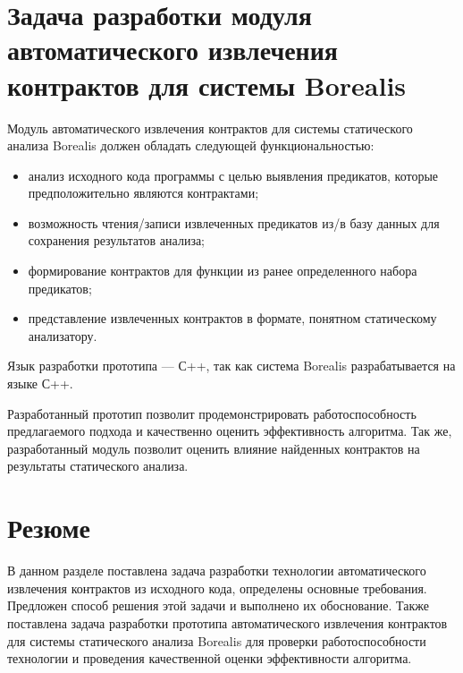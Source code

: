\section{Задача разработки модуля автоматического извлечения контрактов для системы Borealis}
Модуль автоматического извлечения контрактов для системы статического анализа Borealis должен обладать следующей функциональностью:
\begin{itemize}
\item анализ исходного кода программы с целью выявления предикатов, которые предположительно являются контрактами;
\item возможность чтения/записи извлеченных предикатов из/в базу данных для сохранения результатов анализа;
\item формирование контрактов для функции из ранее определенного набора предикатов;
\item представление извлеченных контрактов в формате, понятном статическому анализатору.
\end{itemize}
Язык разработки прототипа --- С++\cite{languageC++}, так как система Borealis разрабатывается на языке С++.

Разработанный прототип позволит продемонстрировать работоспособность предлагаемого подхода и качественно оценить эффективность алгоритма. Так же, разработанный модуль позволит оценить влияние найденных контрактов на результаты статического анализа.

\section{Резюме}
В данном разделе поставлена задача разработки технологии автоматического извлечения контрактов из исходного кода, определены основные требования. Предложен способ решения этой задачи и выполнено их обоснование. Также поставлена задача разработки прототипа автоматического извлечения контрактов для системы статического анализа Borealis для проверки работоспособности технологии и проведения качественной оценки эффективности алгоритма. 